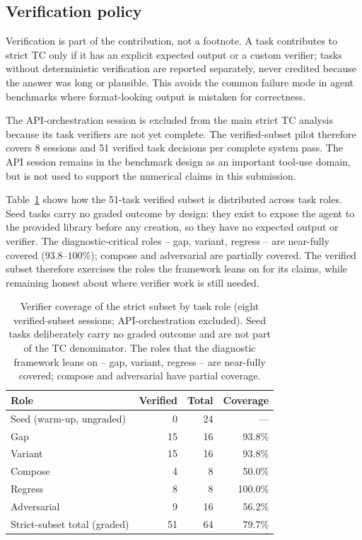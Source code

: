 \documentclass[sigconf,anonymous,natbib=false]{acmart}
\begin{document}
\subsection{Verification policy}

Verification is part of the contribution, not a footnote. A task contributes to strict TC only if it has an explicit expected output or a custom verifier; tasks without deterministic verification are reported separately, never credited because the answer was long or plausible. This avoids the common failure mode in agent benchmarks where format-looking output is mistaken for correctness.

The API-orchestration session is excluded from the main strict TC analysis because its task verifiers are not yet complete. The verified-subset pilot therefore covers 8 sessions and 51 verified task decisions per complete system pass. The API session remains in the benchmark design as an important tool-use domain, but is not used to support the numerical claims in this submission.

Table~\ref{tab:role-coverage} shows how the 51-task verified subset is distributed across task roles. Seed tasks carry no graded outcome by design: they exist to expose the agent to the provided library before any creation, so they have no expected output or verifier. The diagnostic-critical roles -- gap, variant, regress -- are near-fully covered ($93.8$--$100\%$); compose and adversarial are partially covered. The verified subset therefore exercises the roles the framework leans on for its claims, while remaining honest about where verifier work is still needed.

\begin{table}[t]
\centering
\small
\caption{Verifier coverage of the strict subset by task role (eight verified-subset sessions; API-orchestration excluded). Seed tasks deliberately carry no graded outcome and are not part of the TC denominator. The roles that the diagnostic framework leans on -- gap, variant, regress -- are near-fully covered; compose and adversarial have partial coverage.}
\label{tab:role-coverage}
\begin{tabular}{lrrr}
\toprule
\textbf{Role} & \textbf{Verified} & \textbf{Total} & \textbf{Coverage} \\
\midrule
Seed (warm-up, ungraded) & 0  & 24 & --- \\
Gap                      & 15 & 16 & 93.8\% \\
Variant                  & 15 & 16 & 93.8\% \\
Compose                  & 4  & 8  & 50.0\% \\
Regress                  & 8  & 8  & 100.0\% \\
Adversarial              & 9  & 16 & 56.2\% \\
\midrule
Strict-subset total (graded) & 51 & 64 & 79.7\% \\
\bottomrule
\end{tabular}
\end{table}
\end{document}
